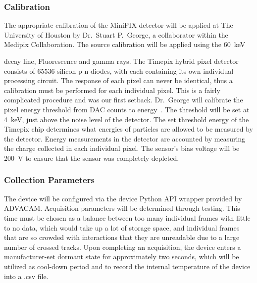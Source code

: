 
\subsubsection{Calibration}   
The appropriate calibration of the MiniPIX detector will be applied at The University of Houston by Dr.~Stuart P.~George, a collaborator within the Medipix Collaboration. The source calibration will be applied using the \SI{60}{\keV} { decay line,  Fluorescence and  gamma rays. The Timepix hybrid pixel detector consists of \num{65536} silicon p-n diodes, with each containing its own individual processing circuit. The response of each pixel can never be identical, thus a calibration must be performed for each individual pixel. This is a fairly complicated procedure and was our first setback. Dr.~George will calibrate the pixel energy threshold from DAC counts to energy~\cite{stuartthesis}. The threshold will be set at \SI{4}{\keV}, just above the noise level of the detector. The set threshold energy of the Timepix chip determines what energies of particles are allowed to be measured by the detector. Energy measurements in the detector are accounted by measuring the charge collected in each individual pixel. The sensor's bias voltage will be \SI{200}{\volt} to ensure that the sensor was completely depleted. 
  
\subsubsection{Collection Parameters}
The device will be configured via the device Python API wrapper provided by ADVACAM. Acquisition parameters will be determined through testing. This time must be chosen as a balance between too many individual frames with little to no data, which would take up a lot of storage space, and individual frames that are so crowded with interactions that they are unreadable due to a large number of crossed tracks. Upon completing an acquisition, the device enters a manufacturer-set dormant state for approximately two seconds, which will be utilized as cool-down period and to record the internal temperature of the device into a .csv file.

}
